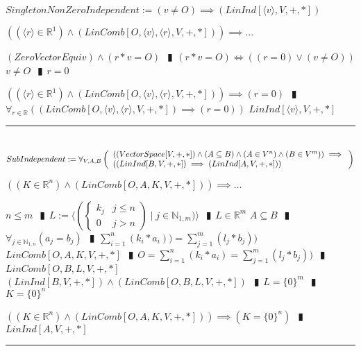 \documentclass{book}
\newcommand{\abr}{:=}
\newcommand{\pipe}{$\phantom{(}\vrectangleblack\phantom{)}$}
\newcommand{\st}{\mathbin{|}}
\begin{document}
$SingletonNonZeroIndependent \abr (v \neq O) \implies (LinInd[\langle v \rangle, V, +, *])$
\begin{enumerate}
  \lit $((\langle r \rangle \in \mathbb{R}^1) \land (LinComb[O, \langle v \rangle , \langle r \rangle, V, +, *])) \implies \ldots$
  \begin{enumerate}
    \lit $(ZeroVectorEquiv) \land (r * v = O)$ \pipe $(r * v = O) \iff ((r = 0) \lor (v \neq O))$
    \lit $v \neq O$ \pipe $r = 0$
  \end{enumerate}
  \lit $((\langle r \rangle \in \mathbb{R}^1) \land (LinComb[O, \langle v \rangle , \langle r \rangle, V, +, *])) \implies (r = 0)$ \pipe $\forall_{r \in \mathbb{R}}((LinComb[O, \langle v \rangle, \langle r \rangle, V, +, *]) \implies (r = 0))$
  \lit $LinInd[\langle v \rangle, V, +, *]$
\end{enumerate} \vspace{.75mm} \hrule \vspace{.75mm} \ \\ 

$SubIndependent \abr \forall_{V, A, B}\left(\begin{array}{ll}
  ((VectorSpace[V, +, *]) \land (A \subseteq B) \land (A \in V^n) \land (B \in V^m)) \hfill \implies \hfill \\
  ((LinInd[B, V, +, *]) \implies (LinInd[A, V, +, *]))
\end{array}\right)$
\begin{enumerate}
  \lit $((K \in \mathbb{R}^n) \land (LinComb[O, A, K, V, +, *])) \implies \ldots$
  \begin{enumerate}
    \lit $n \leq m$ \pipe $L \abr \langle \left(\begin{cases} 
      k_j & j \leq n \\
      0 & j > n 
    \end{cases}\right) \st j \in \mathbb{N}_{1, m}) \rangle$ \pipe $L \in \mathbb{R}^m$
    \lit $A \subseteq B$ \pipe $\forall_{j \in \mathbb{N}_{1, n}}(a_j = b_j)$ \pipe $\sum_{i = 1}^{n}(k_i * a_i)) = \sum_{j = 1}^{m}(l_j * b_j))$
    \lit $LinComb[O, A, K, V, +, *]$ \pipe $O = \sum_{i = 1}^{n}(k_i * a_i) = \sum_{j = 1}^{m}(l_j * b_j))$ \pipe $LinComb[O, B, L, V, +, *]$
    \lit $(LinInd[B, V, +, *]) \land (LinComb[O, B, L, V, +, *])$ \pipe $L = \{0\}^m$ \pipe $K = \{0\}^n$ 
  \end{enumerate}
  \lit $((K \in \mathbb{R}^n) \land (LinComb[O, A, K, V, +, *])) \implies (K = \{0\}^n)$ \pipe $LinInd[A, V, +, *]$
\end{enumerate} \vspace{.75mm} \hrule \vspace{.75mm} \ \\ 
\end{document}

